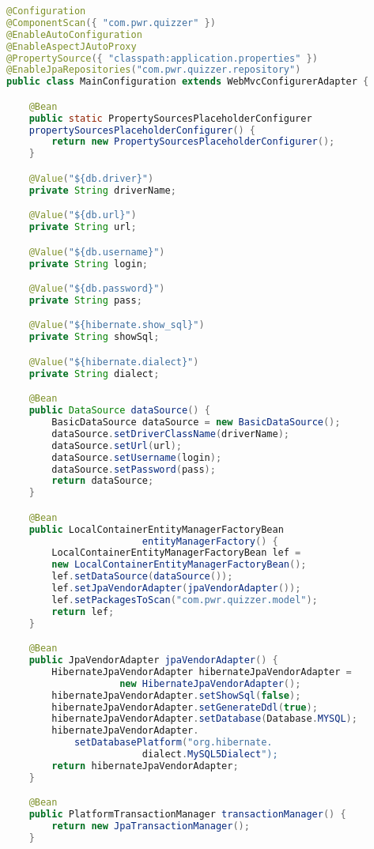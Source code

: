 \documentclass[a4paper, titlepage]{article}
\begin{document}
\begin{lstlisting}[language = JAVA, label=some-code,caption=Plik MainConfiguration.java, linewidth=15.4cm]
@Configuration
@ComponentScan({ "com.pwr.quizzer" })
@EnableAutoConfiguration
@EnableAspectJAutoProxy
@PropertySource({ "classpath:application.properties" })
@EnableJpaRepositories("com.pwr.quizzer.repository")
public class MainConfiguration extends WebMvcConfigurerAdapter {

    @Bean
    public static PropertySourcesPlaceholderConfigurer
    propertySourcesPlaceholderConfigurer() {
        return new PropertySourcesPlaceholderConfigurer();
    }

    @Value("${db.driver}")
    private String driverName;

    @Value("${db.url}")
    private String url;

    @Value("${db.username}")
    private String login;

    @Value("${db.password}")
    private String pass;

    @Value("${hibernate.show_sql}")
    private String showSql;

    @Value("${hibernate.dialect}")
    private String dialect;

    @Bean
    public DataSource dataSource() {
        BasicDataSource dataSource = new BasicDataSource();
        dataSource.setDriverClassName(driverName);
        dataSource.setUrl(url);
        dataSource.setUsername(login);
        dataSource.setPassword(pass);
        return dataSource;
    }

    @Bean
    public LocalContainerEntityManagerFactoryBean 
    					entityManagerFactory() {
        LocalContainerEntityManagerFactoryBean lef =
        new LocalContainerEntityManagerFactoryBean();
        lef.setDataSource(dataSource());
        lef.setJpaVendorAdapter(jpaVendorAdapter());
        lef.setPackagesToScan("com.pwr.quizzer.model");
        return lef;
    }

    @Bean
    public JpaVendorAdapter jpaVendorAdapter() {
        HibernateJpaVendorAdapter hibernateJpaVendorAdapter =
        			new HibernateJpaVendorAdapter();
        hibernateJpaVendorAdapter.setShowSql(false);
        hibernateJpaVendorAdapter.setGenerateDdl(true);
        hibernateJpaVendorAdapter.setDatabase(Database.MYSQL);
        hibernateJpaVendorAdapter.
        	setDatabasePlatform("org.hibernate.
            			dialect.MySQL5Dialect");
        return hibernateJpaVendorAdapter;
    }

    @Bean
    public PlatformTransactionManager transactionManager() {
        return new JpaTransactionManager();
    }


\end{lstlisting}
\end{document}
